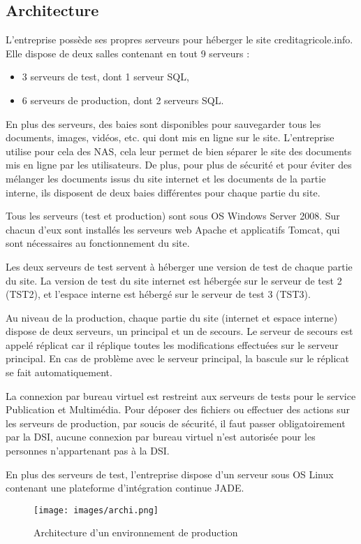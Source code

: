 \documentclass[12pt,a4paper]{article}
\begin{document}
\subsection{Architecture}
L'entreprise possède ses propres serveurs pour héberger le site creditagricole.info. Elle dispose de deux salles contenant en tout 9 serveurs :
\begin{itemize}
\item 3 serveurs de test, dont 1 serveur SQL,
\item 6 serveurs de production, dont 2 serveurs SQL.
\end{itemize}
En plus des serveurs, des baies sont disponibles pour sauvegarder tous les documents, images, vidéos, etc. qui dont mis en ligne sur le site. L'entreprise utilise pour cela des NAS, cela leur permet de bien séparer le site des documents mis en ligne par les utilisateurs. De plus, pour plus de sécurité et pour éviter des mélanger les documents issus du site internet et les documents de la partie interne, ils disposent de deux baies différentes pour chaque partie du site.\par
\medskip
Tous les serveurs (test et production) sont sous OS Windows Server 2008. Sur chacun d'eux sont installés les serveurs web Apache et applicatifs Tomcat, qui sont nécessaires au fonctionnement du site.\par
Les deux serveurs de test servent à héberger une version de test de chaque partie du site. La version de test du site internet est hébergée sur le serveur de test 2 (TST2), et l'espace interne est hébergé sur le serveur de test 3 (TST3).\par
Au niveau de la production, chaque partie du site (internet et espace interne) dispose de deux serveurs, un principal et un de secours. Le serveur de secours est appelé réplicat car il réplique toutes les modifications effectuées sur le serveur principal. En cas de problème avec le serveur principal, la bascule sur le réplicat se fait automatiquement.\par
La connexion par bureau virtuel est restreint aux serveurs de tests pour le service Publication et Multimédia. Pour déposer des fichiers ou effectuer des actions sur les serveurs de production, par soucis de sécurité, il faut passer obligatoirement par la DSI, aucune connexion par bureau virtuel n'est autorisée pour les personnes n'appartenant pas à la DSI.\par
\medskip
En plus des serveurs de test, l'entreprise dispose d'un serveur sous OS Linux contenant une plateforme d'intégration continue \gls{JADE}. 
\begin{figure}[h!]
\centering
\texttt{[image: images/archi.png]} 
\caption{Architecture d'un environnement de production}
\end{figure}
\end{document}
